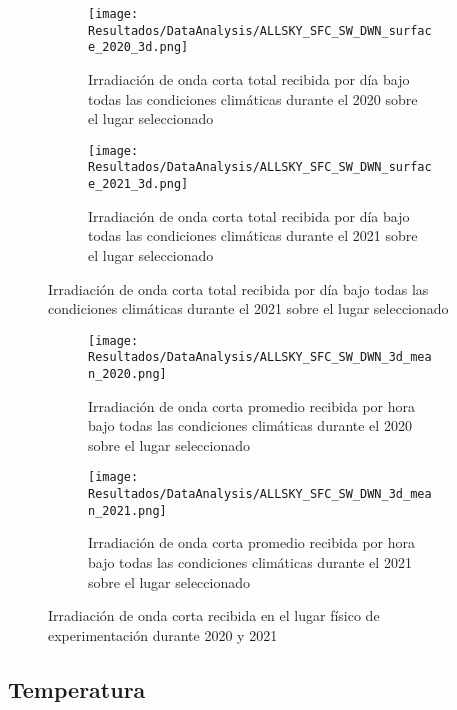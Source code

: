 			\begin{figure}[H]\ContinuedFloat
				\begin{subfigure}[t]{0.45\linewidth}
					\centering
					\texttt{[image: Resultados/DataAnalysis/ALLSKY\_SFC\_SW\_DWN\_surface\_2020\_3d.png]}
					\caption{Irradiación de onda corta total recibida por día bajo todas las condiciones climáticas durante el 2020 sobre el lugar seleccionado}
					\label{fig:ALLSKY_SFC_SW_DWN_surface_2020_3d}
				\end{subfigure}
				\hfill
				\begin{subfigure}[t]{0.45\linewidth}
					\centering
					\texttt{[image: Resultados/DataAnalysis/ALLSKY\_SFC\_SW\_DWN\_surface\_2021\_3d.png]}
					\caption{Irradiación de onda corta total recibida por día bajo todas las condiciones climáticas durante el 2021 sobre el lugar seleccionado}
					\label{fig:ALLSKY_SFC_SW_DWN_surface_2021_3d}
				\end{subfigure}
			\end{figure}
			
			\begin{figure}[H]\ContinuedFloat
				\begin{subfigure}[t]{0.45\linewidth}
					\centering
					\texttt{[image: Resultados/DataAnalysis/ALLSKY\_SFC\_SW\_DWN\_3d\_mean\_2020.png]}
					\caption{Irradiación de onda corta promedio recibida por hora bajo todas las condiciones climáticas durante el 2020 sobre el lugar seleccionado}
					\label{fig:ALLSKY_SFC_SW_DWN_3d_mean_2020}
				\end{subfigure}
				\hfill
				\begin{subfigure}[t]{0.45\linewidth}
					\centering
					\texttt{[image: Resultados/DataAnalysis/ALLSKY\_SFC\_SW\_DWN\_3d\_mean\_2021.png]}
					\caption{Irradiación de onda corta promedio recibida por hora bajo todas las condiciones climáticas durante el 2021 sobre el lugar seleccionado}
					\label{fig:ALLSKY_SFC_SW_DWN_3d_mean_2021}
				\end{subfigure}
				\caption{Irradiación de onda corta recibida en el lugar físico de experimentación durante 2020 y 2021}
				\label{fig:SFC_SW_DWN}
			\end{figure}

		\subsection{Temperatura}
			
